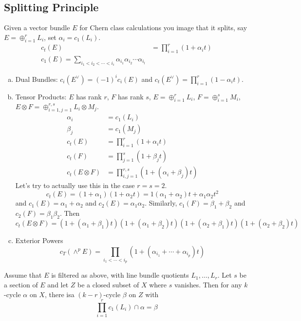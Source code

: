 \subsection{Splitting Principle}

Given a vector bundle $E$ for Chern class calculations you image that it splits, say $E=\oplus_{i=1}^r L_i$, set $\alpha_i=c_1(L_i)$.
	\[
	\begin{split}
	c_t(E)&= \prod_{i=1}^r (1+\alpha_it) \\
	c_1(E)= \sum_{i_1<i_2<\cdots<i_i} \alpha_{i_1}\alpha_{i_2}\cdots \alpha_{i_l}
	\end{split}
	\]
\begin{enumerate}[(a)]
\item Dual Bundles: $c_i(E^\vee)= (-1)^i c_i(E)$ and $c_t(E^\vee)=\prod_{i=1}^r (1-\alpha_i t)$.
\item Tensor Products: $E$ has rank $r$, $F$ has rank $s$, $E=\oplus_{i=1}^r L_i$, $F=\oplus_{i=1}^s M_i$, $E \otimes F= \oplus_{i=1,j=1}^{r,s} L_i \otimes M_j$. 
	\[
	\begin{split}
	\alpha_i&=c_1(L_i) \\
	\beta_j&=c_1(M_j) \\
	c_t(E)&= \prod_{i=1}^r (1+\alpha_it) \\
	c_t(F)&=\prod_{j=1}^s (1+\beta_jt) \\
	c_t(E\otimes F)&= \prod_{i,j=1}^{r,s} ( 1 + (\alpha_i + \beta_j)t)
	\end{split}
	\]
Let's try to actually use this in the case $r=s=2$.
	\[
	c_t(E)=(1+\alpha_1)(1+\alpha_2 t)=1(\alpha_1+\alpha_2)t + \alpha_1\alpha_2 t^2
	\]
and $c_1(E)=\alpha_1+\alpha_2$ and $c_2(E)=\alpha_1\alpha_2$. Similarly, $c_1(F)=\beta_1+\beta_2$ and $c_2(F)=\beta_1\beta_2$. Then
	\[
	c_t(E \otimes F)= (1+(\alpha_1+\beta_1)t)(1+(\alpha_1+\beta_2)t)(1+(\alpha_2+\beta_1)t)(1+(\alpha_2+\beta_2)t)
	\]
\item Exterior Powers
	\[
	c_T(\wedge^p E)= \prod_{i_1<\cdots<i_p} (1+(\alpha_{i_1} + \cdots + \alpha_{i_p})t)
	\]
\end{enumerate}

\begin{lem}
Assume that $E$ is filtered as above, with line bundle quotients $L_1,\ldots,L_r$. Let $s$ be a section of $E$ and let $Z$ be a closed subset of $X$ where $s$ vanishes. Then for any $k$-cycle $\alpha$ on $X$, there isa  $(k-r)$-cycle $\beta$ on $Z$ with
	\[
	\prod_{i=1}^r c_1(L_i) \cap \alpha = \beta
	\]
\end{lem}

